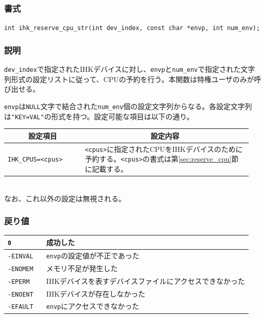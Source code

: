 \documentclass[twoside,11pt,fleqn]{book}
\begin{document}
\subsubsection{}
\subsubsection*{書式}{\quad} \verb:int ihk_reserve_cpu_str(int dev_index, const char *envp, int num_env);:
\subsubsection*{説明}{\quad} \verb:dev_index:で指定されたIHKデバイスに対し、\verb:envp:と\verb:num_env:で指定された文字列形式の設定リストに従って、CPUの予約を行う。本関数は特権ユーザのみが呼び出せる。

\verb:envp:は\verb:NULL:文字で結合された\verb:num_env:個の設定文字列からなる。各設定文字列は\verb:"KEY=VAL":の形式を持つ。設定可能な項目は以下の通り。
\begin{table}[!h]
\footnotesize
\begin{tabular}{|p{0.30\linewidth}|p{0.65\linewidth}|} \hline
\multicolumn{1}{|c}{\textbf{設定項目}}&\multicolumn{1}{|c|}{\textbf{設定内容}}\\ \hline \hline
\verb:IHK_CPUS=<cpus>:&\verb:<cpus>:に指定されたCPUをIHKデバイスのために予約する。\verb:<cpus>:の書式は第\ref{sec:reserve_cpu}節に記載する。\\ \hline
\end{tabular}
\vspace{-0em}
\end{table}
\\なお、これ以外の設定は無視される。
\FloatBarrier

\subsubsection*{戻り値}
\begin{table}[!h]
\footnotesize
\begin{tabular}{|p{0.15\linewidth}|p{0.80\linewidth}|} \hline
\verb:0:&	成功した\\ \hline
\verb:-EINVAL:&	\verb:envp:の設定値が不正であった\\ \hline
\verb:-ENOMEM:&	メモリ不足が発生した\\ \hline
\verb:-EPERM:&	IHKデバイスを表すデバイスファイルにアクセスできなかった\\ \hline
\verb:-ENOENT:&	IHKデバイスが存在しなかった\\ \hline
\verb:-EFAULT:&	\texttt{envp}にアクセスできなかった\\ \hline
\end{tabular}
\vspace{-0em}
\end{table}
\FloatBarrier
\end{document}

